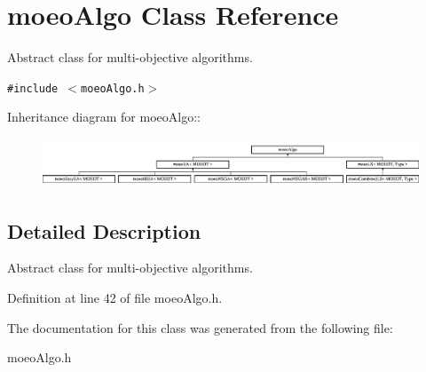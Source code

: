 \section{moeo\-Algo Class Reference}
\label{classmoeoAlgo}
Abstract class for multi-objective algorithms.  


{\tt \#include $<$moeo\-Algo.h$>$}

Inheritance diagram for moeo\-Algo::\begin{figure}[H]
\begin{center}
\leavevmode
\includegraphics[height=1.47368cm]{classmoeoAlgo}
\end{center}
\end{figure}


\subsection{Detailed Description}
Abstract class for multi-objective algorithms. 



Definition at line 42 of file moeo\-Algo.h.

The documentation for this class was generated from the following file:\begin{CompactItemize}
\item 
moeo\-Algo.h\end{CompactItemize}
